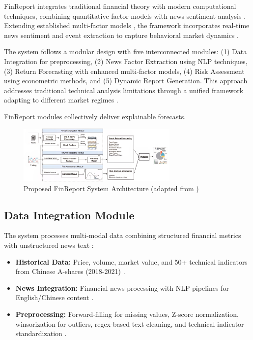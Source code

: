 \documentclass[3p,times,procedia]{elsarticle}
\begin{document}
FinReport integrates traditional financial theory with modern computational techniques, combining quantitative factor models \cite{FAMA1993,Carhart1997} with news sentiment analysis \cite{TETLOCK2007,Xing2018}. Extending established multi-factor models \cite{Banz1981,Rosenberg1985}, the framework incorporates real-time news sentiment and event extraction to capture behavioral market dynamics \cite{Daniel1998,Campbell2001}.

The system follows a modular design \cite{Fischer2018} with five interconnected modules: (1) Data Integration for preprocessing, (2) News Factor Extraction using NLP techniques, (3) Return Forecasting with enhanced multi-factor models, (4) Risk Assessment using econometric methods, and (5) Dynamic Report Generation. This approach addresses traditional technical analysis limitations \cite{Murphy1999,Wilder1978} through a unified framework adapting to different market regimes \cite{Lo2004}.

FinReport modules collectively deliver explainable forecasts.
\begin{figure}[!ht]
    \centering
    \includegraphics[width=0.70\textwidth]{flowchart.jpg}
    \caption{Proposed FinReport System Architecture (adapted from \cite{Li2024})}
    \label{fig:workflow_diagram}
\end{figure}
\subsection{{Data Integration Module}}

The system processes multi-modal data combining structured financial metrics with unstructured news text \cite{Harvey2016,Campbell2001}:

\begin{itemize}

\item \textbf{Historical Data:} Price, volume, market value, and 50+ technical indicators \cite{Murphy1999,Wilder1978} from Chinese A-shares (2018-2021) \cite{FinReportDataset2025}.

\item \textbf{News Integration:} Financial news processing with NLP pipelines for English/Chinese content \cite{Loughran2011,Xing2018}.

\item \textbf{Preprocessing:} Forward-filling for missing values, Z-score normalization, winsorization for outliers, regex-based text cleaning, and technical indicator standardization \cite{Fischer2018,Harvey2016}.
\end{itemize}
\end{document}
